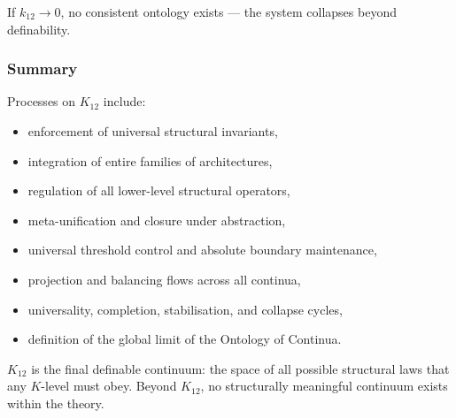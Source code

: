 If $k_{12} \to 0$,  
no consistent ontology exists --- the system collapses beyond definability.

\subsubsection{Summary}

Processes on $K_{12}$ include:
\begin{itemize}
    \item enforcement of universal structural invariants,
    \item integration of entire families of architectures,
    \item regulation of all lower-level structural operators,
    \item meta-unification and closure under abstraction,
    \item universal threshold control and absolute boundary maintenance,
    \item projection and balancing flows across all continua,
    \item universality, completion, stabilisation, and collapse cycles,
    \item definition of the global limit of the Ontology of Continua.
\end{itemize}

$K_{12}$ is the final definable continuum:  
the space of all possible structural laws that any $K$-level must obey.  
Beyond $K_{12}$, no structurally meaningful continuum exists within the theory.
